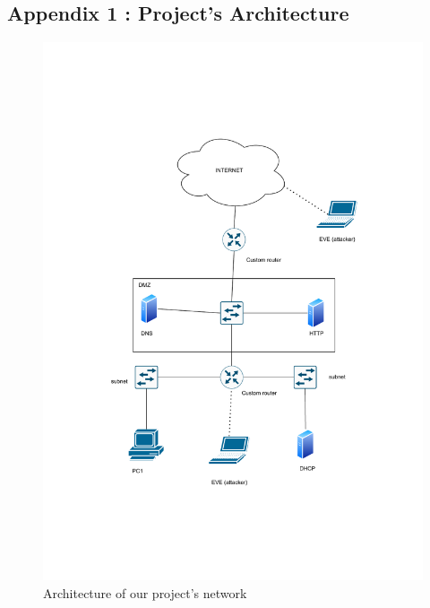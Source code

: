 \documentclass[a4paper,11pt,singlespacing]{article}
\begin{document}
\subsection{Appendix 1 : Project's Architecture}
\label{Appendix1}
\begin{figure}[bp!]
    \centering
    \includegraphics[scale=1.03]{images/architecture_sketch_changed.pdf}
    \caption{Architecture of our project's network}
    \label{fig:1}
\end{figure}
\end{document}
